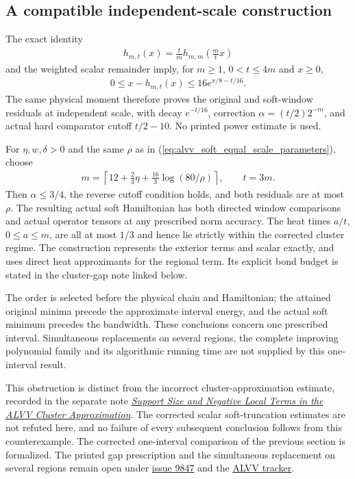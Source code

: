 \documentclass{article}
\begin{document}
\subsection{A compatible independent-scale construction}

The exact identity
\begin{align}
    h_{m,t}(x)=\frac tm h_{m,m}\left(\frac mt x\right)
    \label{eq:alvv_soft_scale_identity}
\end{align}
and the weighted scalar remainder imply, for $m\geq1$, $0<t\leq4m$ and
$x\geq0$,
\begin{align}
    0\leq x-h_{m,t}(x)\leq16e^{x/8-t/16}.
    \label{eq:alvv_soft_independent_scale_remainder}
\end{align}
The same physical moment therefore proves the original and soft-window
residuals at independent scale, with decay $e^{-t/16}$, correction
$\alpha=(t/2)2^{-m}$, and actual hard comparator cutoff $t/2-10$.
No printed power estimate is used.

For $\eta,w,\delta>0$ and the same $\rho$ as in (\ref{eq:alvv_soft_equal_scale_parameters}), choose
\begin{align}
    m=\left\lceil12+\frac23\eta+
    \frac{16}{3}\log(80/\rho)\right\rceil,
    \qquad t=3m.
    \label{eq:alvv_soft_independent_scale_parameters}
\end{align}
Then $\alpha\leq3/4$, the reverse cutoff condition holds, and both
residuals are at most $\rho$. The resulting actual soft Hamiltonian has
both directed window comparisons and actual operator tensors at any
prescribed norm accuracy. The heat times $a/t$, $0\leq a\leq m$, are
all at most $1/3$ and hence lie strictly within the corrected cluster
regime. The construction represents the exterior terms and scalar exactly,
and uses direct heat approximants for the regional term. Its explicit
bond budget is stated in the cluster-gap note linked below.

The order is selected before the physical chain and Hamiltonian; the
attained original minima precede the approximate interval energy, and the
actual soft minimum precedes the bandwidth. These conclusions concern one
prescribed interval. Simultaneous replacements on several regions, the
complete improving polynomial family and its algorithmic running time
are not supplied by this one-interval result.

This obstruction is distinct from the incorrect cluster-approximation
estimate, recorded in the separate note
\href{https://sirui-lu.com/TNLean/paper-gaps/alvv16_cluster_approximation.pdf}
{\emph{Support Size and Negative Local Terms in the ALVV Cluster Approximation}}.
The corrected scalar soft-truncation estimates are not refuted here, and no
failure of every subsequent conclusion follows from this counterexample.
The corrected one-interval comparison of the previous section is formalized.
The printed gap prescription and the simultaneous replacement on several
regions remain open under
\href{https://github.com/LionSR/TNLean/issues/9847}{issue 9847} and the
\href{https://github.com/LionSR/TNLean/issues/9833}{ALVV tracker}.



\end{document}
